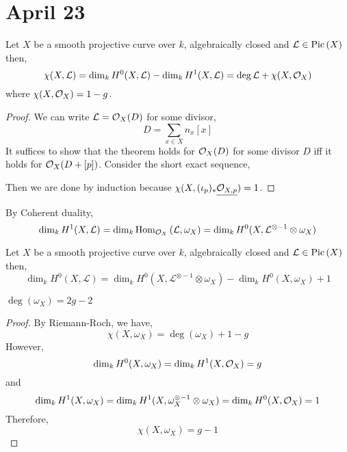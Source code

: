 \documentclass[12pt]{article}
\begin{document}
\section{April 23}

\begin{theorem}
Let $X$ be a smooth projective curve over $k$, algebraically closed and $\mathcal{L} \in \mathrm{Pic} \left( X \right)$ then,
\[ \chi(X, \mathcal{L}) = \dim_k H^0(X, \mathcal{L}) - \dim_k H^1(X, \mathcal{L}) = \deg \mathcal{L} + \chi(X, \mathcal{O}_{X}) \]
where $\chi(X, \mathcal{O}_{X}) = 1 - g$. 
\end{theorem}

\begin{proof}
We can write $\mathcal{L} = \mathcal{O}_{X}(D)$ for some divisor,
\[ D = \sum_{x \in X} n_x [x] \]
It suffices to show that the theorem holds for $\mathcal{O}_{X}(D)$ for some divisor $D$ iff it holds for $\mathcal{O}_{X}(D + [p])$. Consider the short exact sequence,
\begin{center}
\end{center}
Then we are done by induction because $\chi(X, (\iota_p)_* \underline{\mathcal{O}_{X, p}}) = 1$.
\end{proof}

\begin{lemma}
By Coherent duality,
\[ \dim_k H^1(X, \mathcal{L}) = \dim_k \text{Hom}_{\mathcal{O}_{X}}\left( \mathcal{L}, \omega_X \right) = \dim_k H^0(X, \mathcal{L}^{\otimes -1} \otimes \omega_X) \]
\end{lemma}

\begin{theorem}
Let $X$ be a smooth projective curve over $k$, algebraically closed and $\mathcal{L} \in \mathrm{Pic} \left( X \right)$ then,
\[ \dim_k H^0(X, \mathcal{L}) = \dim_k H^0(X, \mathcal{L}^{\otimes -1} \otimes \omega_X) - \dim_k H^0(X, \omega_X) + 1 \]
\end{theorem}

\begin{proposition}
$\deg{(\omega_X)} = 2g - 2$
\end{proposition}

\begin{proof}
By Riemann-Roch, we have,
\[ \chi(X, \omega_X) = \deg{(\omega_X)} + 1 - g \]
However, 
\[ \dim_k H^0(X, \omega_X) = \dim_k H^1(X, \mathcal{O}_{X}) = g \]
and
\[ \dim_k H^1(X, \omega_X) = \dim_k H^1(X, \omega_X^{\otimes -1} \otimes \omega_X) = \dim_k H^0(X, \mathcal{O}_{X}) = 1  \]
Therefore,
\[ \chi(X, \omega_X) = g - 1\]
\end{proof}
\end{document}
